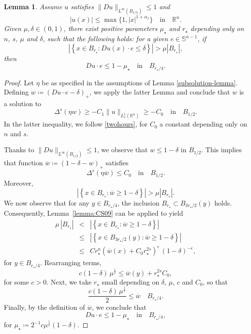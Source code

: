 \documentclass[reqno,11pt]{amsart}
\newtheorem{lemma}{Lemma}[section]
\numberwithin{equation}{section}
\numberwithin{equation}{section}
\begin{document}
\begin{lemma}\label{reg-at-critical-points-step1} 
Assume $u$ satisfies $\|Du\|_{L^\infty(B_{1/2})} \leq 1$ and
$$
    |u(x)|\leq \max\{1,|x|^{1+\alpha_1}\} \quad \mbox{in} \quad \mathbb{R}^n.
$$
Given $\mu, \delta \in (0,1)$, there exist positive parameters $\mu_\star$ and $r_\star$ depending only on $n$, $s$, $\mu$ and $\delta$, such that the following holds: for a given $e \in \mathbb{S}^{n-1}$, if
$$
    \left|\left\{x \in B_{r_\star} \colon Du(x) \cdot e \leq  \delta \right\} \right| > \mu |B_{r_\star}|,
$$
then
$$
    Du \cdot e \leq 1-\mu_\star \quad \mbox{in} \quad B_{r_\star/4}.
$$
\end{lemma}
\begin{proof}
Let \(\eta\) be as specified in the assumptions of Lemma \ref{subsolution-lemma}. Defining \( w \coloneqq (Du \cdot e - \delta)_+ \), we apply the latter Lemma and conclude that \( w \) is a solution to
$$
    \Delta^s \left(\eta w\right) \geq -C_1\|u\|_{L^1_s(\mathbb{R}^n)} \geq -C_0  \quad \mbox{in} \quad B_{1/2}.
$$
In the latter inequality, we follow \eqref{twohours}, for $C_0$ a constant depending only on $n$ and $s$. 
 
Thanks to $\|Du\|_{L^\infty(B_{1/2})} \leq 1$, we observe that $w \leq 1 - \delta$ in $B_{1/2}$. This implies that function $\overline{w} \coloneqq (1-\delta - w)_+$ satisfies
$$
     \Delta^s \left(\eta \overline{w}\right) \leq C_0 \quad \mbox{in} \quad B_{1/2}.
$$
Moreover, 
$$
    \left|\left\{x \in B_{r_\star}\colon \overline{w} \geq 1-\delta   \right\}\right| > \mu\left|B_{r_\star}\right|.
$$
We now observe that for any $y \in B_{r_\star/4}$, the inclusion $B_{r_\star} \subset B_{3r_\star/2}(y)$ holds. Consequently, Lemma~\ref{lemma:CS09} can be applied to yield
\begin{eqnarray*}
    \mu\,|B_{r_\star}| &< & \left|\left\{x \in B_{r_\star}\colon \overline{w} \geq 1-\delta   \right\}\right|\\
    & \leq & \left|\left\{x \in B_{3r_\star/2}(y) \colon \overline{w} \geq 1-\delta   \right\}\right|\\
    & \leq & Cr_{\star}^n(\overline{w}(x) + C_0r_{\star}^{2s})^\epsilon\, (1-\delta)^{-\epsilon},
\end{eqnarray*}
for $y \in B_{r_\star/4}$. Rearranging terms,
$$
    c(1-\delta)\,\mu^{\frac{1}{\epsilon}} \leq \overline{w}(y) + r_\star^{2s} C_0,
$$
for some $c>0$. Next, we take $r_\star$ small depending on $\delta$, $\mu$, $c$ and $C_0$, so that
$$
    \frac{c(1-\delta)\,\mu^{\frac{1}{\epsilon}}}{2} \leq \overline{w} \quad B_{r_\star/4}.
$$
Finally, by the definition of $\overline{w}$, we conclude that
$$
    Du\cdot e \leq  1-\mu_\star \quad \mbox{in} \quad B_{r_\star/4},
$$
for $\mu_\star \coloneqq 2^{-1}c\mu^{\frac{1}{\epsilon}}(1-\delta)$.
\end{proof}
\end{document}
